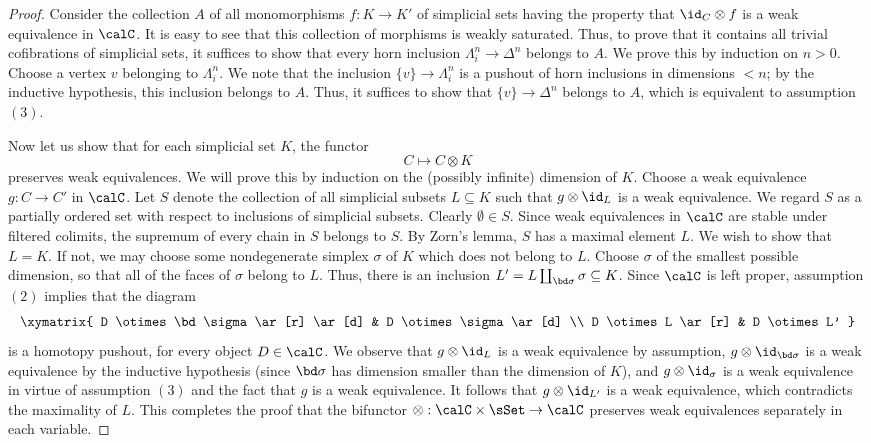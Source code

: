 \begin{Simplicial Categories}
\begin{proof}
Consider the collection $A$ of all monomorphisms $f: K \rightarrow K'$ of simplicial sets having the property that $\id_{C} \otimes f$ is a weak equivalence in $\calC$. It is easy to see that this collection of morphisms is weakly saturated. Thus, to prove that it contains all trivial cofibrations of simplicial sets, it suffices to show that every horn inclusion $\Lambda^n_i \rightarrow \Delta^n$
belongs to $A$. We prove this by induction on $n > 0$. Choose a vertex $v$ belonging to
$\Lambda^n_i$. We note that the inclusion $\{v\} \rightarrow \Lambda^n_i$ is a pushout of horn inclusions in dimensions $< n$; by the inductive hypothesis, this inclusion belongs to $A$.
Thus, it suffices to show that $\{v\} \rightarrow \Delta^n$ belongs to $A$, which is equivalent to assumption $(3)$.

Now let us show that for each simplicial set $K$, the functor
$$ C \mapsto C \otimes K$$ preserves weak equivalences. We will prove this by induction on the (possibly infinite) dimension of $K$. Choose a weak equivalence
$g: C \rightarrow C'$ in $\calC$. Let $S$ denote the collection of all simplicial subsets $L \subseteq K$ such that $g \otimes \id_{L}$ is a weak equivalence. We regard $S$ as a partially ordered set with respect to inclusions of simplicial subsets. Clearly $\emptyset \in S$. Since weak equivalences in $\calC$ are stable under filtered colimits, the supremum of every chain in $S$ belongs to $S$.
By Zorn's lemma, $S$ has a maximal element $L$. We wish to show that $L = K$. If not, 
we may choose some nondegenerate simplex $\sigma$ of $K$ which does not belong to $L$. Choose $\sigma$ of the smallest possible dimension, so that all of the faces of $\sigma$ belong to $L$. Thus, there is an inclusion $L' = L \coprod_{ \bd \sigma} \sigma \subseteq K$. Since
$\calC$ is left proper, assumption $(2)$ implies that the diagram
$$ \xymatrix{ D \otimes \bd \sigma \ar[r] \ar[d] & D \otimes \sigma \ar[d] \\
D \otimes L \ar[r] & D \otimes L' }$$
is a homotopy pushout, for every object $D \in \calC$. We observe that
$g \otimes \id_{L}$ is a weak equivalence by assumption, $g \otimes \id_{\bd \sigma}$ is
a weak equivalence by the inductive hypothesis (since $\bd \sigma$ has dimension smaller than the dimension of $K$), and $g \otimes \id_{\sigma}$ is a weak equivalence in virtue of assumption $(3)$ and the fact that $g$ is a weak equivalence. It follows that $g \otimes \id_{L'}$ is a weak equivalence, which contradicts the maximality of $L$. This completes the proof that the bifunctor
$\otimes: \calC \times \sSet \rightarrow \calC$ preserves weak equivalences separately in each variable.


\end{proof}
\end{Simplicial Categories}

